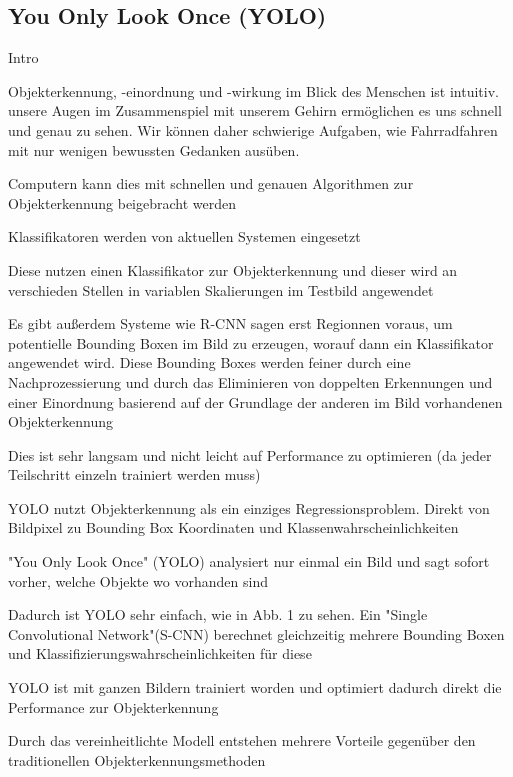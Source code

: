 {	\subsection{You Only Look Once (YOLO)}
	\begin{list}{-}{Quelle: \citet{Plastiras2018}}
		\item Intro
			\item Objekterkennung, -einordnung und -wirkung im Blick des Menschen ist intuitiv. unsere Augen im Zusammenspiel mit unserem Gehirn ermöglichen es uns schnell und genau zu sehen. Wir können daher schwierige Aufgaben, wie Fahrradfahren mit nur wenigen bewussten Gedanken ausüben.
			\item Computern kann dies mit schnellen und genauen Algorithmen zur Objekterkennung beigebracht werden
			\item Klassifikatoren werden von aktuellen Systemen eingesetzt
			\item Diese nutzen einen Klassifikator zur Objekterkennung und dieser wird an verschieden Stellen in variablen Skalierungen im Testbild angewendet
			\item Es gibt außerdem Systeme wie R-CNN sagen erst Regionnen voraus, um potentielle Bounding Boxen im Bild zu erzeugen, worauf dann ein Klassifikator angewendet wird. Diese Bounding Boxes werden feiner durch eine Nachprozessierung und durch das Eliminieren von doppelten Erkennungen und einer Einordnung basierend auf der Grundlage der anderen im Bild vorhandenen Objekterkennung 
			\item Dies ist sehr langsam und nicht leicht auf Performance zu optimieren (da jeder Teilschritt einzeln trainiert werden muss)
			\item YOLO nutzt Objekterkennung als ein einziges Regressionsproblem. Direkt von Bildpixel zu Bounding Box Koordinaten und Klassenwahrscheinlichkeiten
			\item "You Only Look Once" (YOLO) analysiert nur einmal ein Bild und sagt sofort vorher, welche Objekte wo vorhanden sind
			\item Dadurch ist YOLO sehr einfach, wie in Abb. 1 zu sehen. Ein "Single Convolutional Network"(S-CNN) berechnet gleichzeitig mehrere Bounding Boxen und Klassifizierungswahrscheinlichkeiten für diese
			\item YOLO ist mit ganzen Bildern trainiert worden und optimiert dadurch direkt die Performance zur Objekterkennung
			\item Durch das vereinheitlichte Modell entstehen mehrere Vorteile gegenüber den traditionellen Objekterkennungsmethoden

\end{list}}
